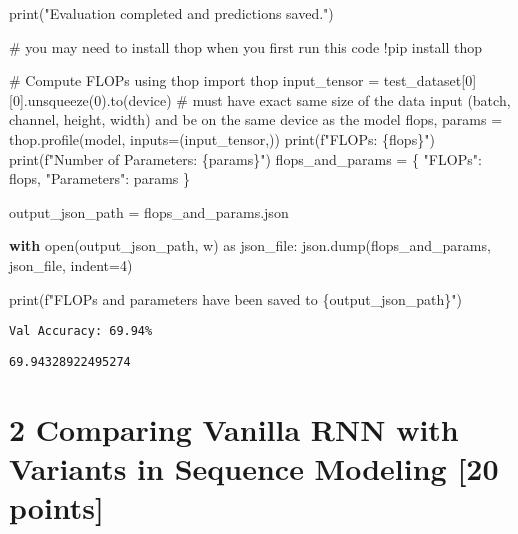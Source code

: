 \documentclass[
  letterpaper,
  DIV=11,
  numbers=noendperiod]{scrartcl}
\newenvironment{Shaded}{\begin{snugshade}}{\end{snugshade}}
\newcommand{\BuiltInTok}[1]{\textcolor[rgb]{0.00,0.23,0.31}{#1}}
\newcommand{\CommentTok}[1]{\textcolor[rgb]{0.37,0.37,0.37}{#1}}
\newcommand{\ControlFlowTok}[1]{\textcolor[rgb]{0.00,0.23,0.31}{\textbf{#1}}}
\newcommand{\DecValTok}[1]{\textcolor[rgb]{0.68,0.00,0.00}{#1}}
\newcommand{\ImportTok}[1]{\textcolor[rgb]{0.00,0.46,0.62}{#1}}
\newcommand{\NormalTok}[1]{\textcolor[rgb]{0.00,0.23,0.31}{#1}}
\newcommand{\OperatorTok}[1]{\textcolor[rgb]{0.37,0.37,0.37}{#1}}
\newcommand{\SpecialCharTok}[1]{\textcolor[rgb]{0.37,0.37,0.37}{#1}}
\newcommand{\SpecialStringTok}[1]{\textcolor[rgb]{0.13,0.47,0.30}{#1}}
\newcommand{\StringTok}[1]{\textcolor[rgb]{0.13,0.47,0.30}{#1}}
\begin{document}
\begin{Shaded}
\begin{Highlighting}[]
\BuiltInTok{print}\NormalTok{(}\StringTok{"Evaluation completed and predictions saved."}\NormalTok{)}

\CommentTok{\# you may need to install thop when you first run this code}
\OperatorTok{!}\NormalTok{pip install thop}

\CommentTok{\# Compute FLOPs using thop}
\ImportTok{import}\NormalTok{ thop}
\NormalTok{input\_tensor }\OperatorTok{=}\NormalTok{ test\_dataset[}\DecValTok{0}\NormalTok{][}\DecValTok{0}\NormalTok{].unsqueeze(}\DecValTok{0}\NormalTok{).to(device) }\CommentTok{\# must have exact same size of the data input (batch, channel, height, width) and be on the same device as the model}
\NormalTok{flops, params }\OperatorTok{=}\NormalTok{ thop.profile(model, inputs}\OperatorTok{=}\NormalTok{(input\_tensor,))}
\BuiltInTok{print}\NormalTok{(}\SpecialStringTok{f"FLOPs: }\SpecialCharTok{\{}\NormalTok{flops}\SpecialCharTok{\}}\SpecialStringTok{"}\NormalTok{)}
\BuiltInTok{print}\NormalTok{(}\SpecialStringTok{f"Number of Parameters: }\SpecialCharTok{\{}\NormalTok{params}\SpecialCharTok{\}}\SpecialStringTok{"}\NormalTok{)}
\NormalTok{flops\_and\_params }\OperatorTok{=}\NormalTok{ \{}
    \StringTok{"FLOPs"}\NormalTok{: flops,}
    \StringTok{"Parameters"}\NormalTok{: params}
\NormalTok{\}}

\NormalTok{output\_json\_path }\OperatorTok{=} \StringTok{\textquotesingle{}flops\_and\_params.json\textquotesingle{}}

\ControlFlowTok{with} \BuiltInTok{open}\NormalTok{(output\_json\_path, }\StringTok{\textquotesingle{}w\textquotesingle{}}\NormalTok{) }\ImportTok{as}\NormalTok{ json\_file:}
\NormalTok{    json.dump(flops\_and\_params, json\_file, indent}\OperatorTok{=}\DecValTok{4}\NormalTok{)}

\BuiltInTok{print}\NormalTok{(}\SpecialStringTok{f"FLOPs and parameters have been saved to }\SpecialCharTok{\{}\NormalTok{output\_json\_path}\SpecialCharTok{\}}\SpecialStringTok{"}\NormalTok{)}
\end{Highlighting}
\end{Shaded}

\begin{verbatim}
Val Accuracy: 69.94%
\end{verbatim}

\label{prob1}
\begin{verbatim}
69.94328922495274
\end{verbatim}

\section{2 Comparing Vanilla RNN with Variants in Sequence Modeling
{[}20
points{]}}\label{comparing-vanilla-rnn-with-variants-in-sequence-modeling-20-points}
\end{document}
